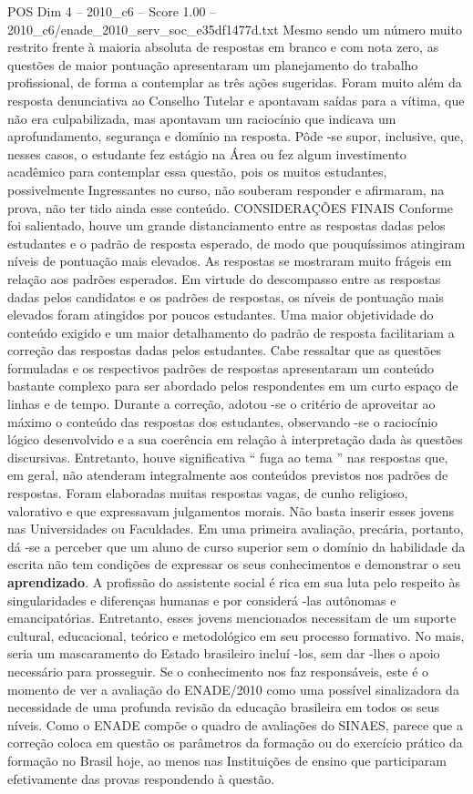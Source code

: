\begin{textsample}{POS Dim 4 – 2010\_c6 – Score 1.00 – 2010\_c6/enade\_2010\_serv\_soc\_e35df1477d.txt}
Mesmo sendo um número muito restrito frente à maioria absoluta de respostas em branco e com nota zero, as questões de maior pontuação apresentaram um planejamento do trabalho profissional, de forma a contemplar as três ações sugeridas.
Foram muito além da resposta denunciativa ao Conselho Tutelar e apontavam saídas para a vítima, que não era culpabilizada, mas apontavam um raciocínio que indicava um aprofundamento, segurança e domínio na resposta.
Pôde -se supor, inclusive, que, nesses casos, o estudante fez estágio na Área ou fez algum investimento acadêmico para contemplar essa questão, pois os muitos estudantes, possivelmente Ingressantes no curso, não souberam responder e afirmaram, na prova, não ter tido ainda esse conteúdo.
CONSIDERAÇÕES FINAIS Conforme foi salientado, houve um grande distanciamento entre as respostas dadas pelos estudantes e o padrão de resposta esperado, de modo que pouquíssimos atingiram níveis de pontuação mais elevados.
As respostas se mostraram muito frágeis em relação aos padrões esperados.
Em virtude do descompasso entre as respostas dadas pelos candidatos e os padrões de respostas, os níveis de pontuação mais elevados foram atingidos por poucos estudantes.
Uma maior objetividade do conteúdo exigido e um maior detalhamento do padrão de resposta facilitariam a correção das respostas dadas pelos estudantes.
Cabe ressaltar que as questões formuladas e os respectivos padrões de respostas apresentaram um conteúdo bastante complexo para ser abordado pelos respondentes em um curto espaço de linhas e de tempo.
Durante a correção, adotou -se o critério de aproveitar ao máximo o conteúdo das respostas dos estudantes, observando -se o raciocínio lógico desenvolvido e a sua coerência em relação à interpretação dada às questões discursivas.
Entretanto, houve significativa “ fuga ao tema ” nas respostas que, em geral, não atenderam integralmente aos conteúdos previstos nos padrões de respostas.
Foram elaboradas muitas respostas vagas, de cunho religioso, valorativo e que expressavam julgamentos morais.
Não basta inserir esses jovens nas Universidades ou Faculdades.
Em uma primeira avaliação, precária, portanto, dá -se a perceber que um aluno de curso superior sem o domínio da habilidade da escrita não tem condições de expressar os seus conhecimentos e demonstrar o seu \textbf{aprendizado}.
A profissão do assistente social é rica em sua luta pelo respeito às singularidades e diferenças humanas e por considerá -las autônomas e emancipatórias.
Entretanto, esses jovens mencionados necessitam de um suporte cultural, educacional, teórico e metodológico em seu processo formativo.
No mais, seria um mascaramento do Estado brasileiro incluí -los, sem dar -lhes o apoio necessário para prosseguir.
Se o conhecimento nos faz responsáveis, este é o momento de ver a avaliação do ENADE/2010 como uma possível sinalizadora da necessidade de uma profunda revisão da educação brasileira em todos os seus níveis.
Como o ENADE compõe o quadro de avaliações do SINAES, parece que a correção coloca em questão os parâmetros da formação ou do exercício prático da formação no Brasil hoje, ao menos nas Instituições de ensino que participaram efetivamente das provas respondendo à questão.


\end{textsample}
